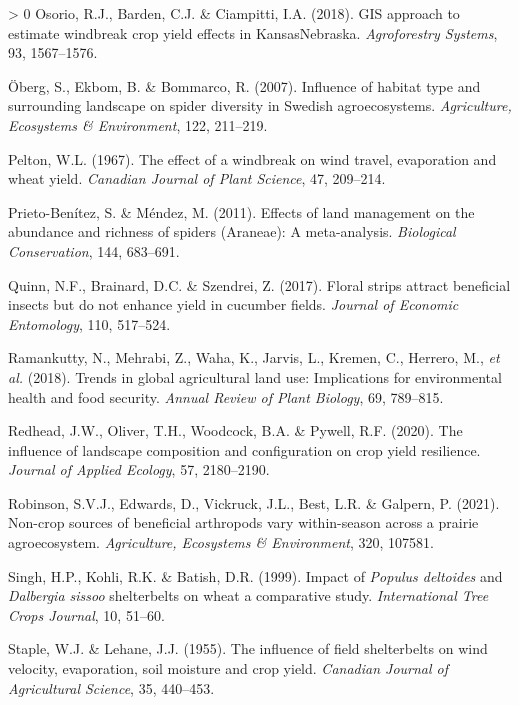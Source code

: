 \documentclass[]{elsarticle} %
\newlength{\cslhangindent}
\newenvironment{CSLReferences}[3] %
 {%
  \setlength{\parindent}{0pt}
  \ifodd #1 \everypar{\setlength{\hangindent}{\cslhangindent}}\ignorespaces\fi
  \ifnum #2 > 0
  \setlength{\parskip}{#2\baselineskip}
  \fi
 }%
 {}
\begin{document}
\begin{CSLReferences}{1}{0}
\leavevmode\hypertarget{ref-osorio2018}{}%
Osorio, R.J., Barden, C.J. \& Ciampitti, I.A. (2018). {GIS} approach to estimate windbreak crop yield effects in {Kansas}{{}}{Nebraska}. \emph{Agroforestry Systems}, 93, 1567--1576.

\leavevmode\hypertarget{ref-oberg2007}{}%
Öberg, S., Ekbom, B. \& Bommarco, R. (2007). Influence of habitat type and surrounding landscape on spider diversity in {Swedish} agroecosystems. \emph{Agriculture, Ecosystems {\&} Environment}, 122, 211--219.

\leavevmode\hypertarget{ref-pelton1967}{}%
Pelton, W.L. (1967). The effect of a windbreak on wind travel, evaporation and wheat yield. \emph{Canadian Journal of Plant Science}, 47, 209--214.

\leavevmode\hypertarget{ref-prietoBenitez2011}{}%
Prieto-Benítez, S. \& Méndez, M. (2011). Effects of land management on the abundance and richness of spiders ({Araneae}): A meta-analysis. \emph{Biological Conservation}, 144, 683--691.

\leavevmode\hypertarget{ref-quinn2017}{}%
Quinn, N.F., Brainard, D.C. \& Szendrei, Z. (2017). Floral strips attract beneficial insects but do not enhance yield in cucumber fields. \emph{Journal of Economic Entomology}, 110, 517--524.

\leavevmode\hypertarget{ref-ramankutty2018}{}%
Ramankutty, N., Mehrabi, Z., Waha, K., Jarvis, L., Kremen, C., Herrero, M., \emph{et al.} (2018). Trends in global agricultural land use: Implications for environmental health and food security. \emph{Annual Review of Plant Biology}, 69, 789--815.

\leavevmode\hypertarget{ref-redhead2020}{}%
Redhead, J.W., Oliver, T.H., Woodcock, B.A. \& Pywell, R.F. (2020). The influence of landscape composition and configuration on crop yield resilience. \emph{Journal of Applied Ecology}, 57, 2180--2190.

\leavevmode\hypertarget{ref-robinson2021}{}%
Robinson, S.V.J., Edwards, D., Vickruck, J.L., Best, L.R. \& Galpern, P. (2021). Non-crop sources of beneficial arthropods vary within-season across a prairie agroecosystem. \emph{Agriculture, Ecosystems {\&} Environment}, 320, 107581.

\leavevmode\hypertarget{ref-singh1999}{}%
Singh, H.P., Kohli, R.K. \& Batish, D.R. (1999). Impact of {\emph{Populus deltoides}} and {\emph{Dalbergia sissoo}} shelterbelts on wheat {}a comparative study. \emph{International Tree Crops Journal}, 10, 51--60.

\leavevmode\hypertarget{ref-staple1955}{}%
Staple, W.J. \& Lehane, J.J. (1955). The influence of field shelterbelts on wind velocity, evaporation, soil moisture and crop yield. \emph{Canadian Journal of Agricultural Science}, 35, 440--453.


\end{CSLReferences}
\end{document}
